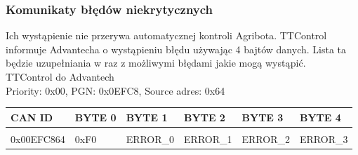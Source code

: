 \documentclass{article}
\begin{document}
\subsubsection{Komunikaty błędów niekrytycznych}
Ich wystąpienie nie przerywa automatycznej kontroli Agribota. TTControl informuje Advantecha o wystąpieniu błędu używając 4 bajtów danych. Lista ta będzie uzupełniania w raz z możliwymi błędami jakie mogą wystąpić.\\
TTControl do Advantech\\
Priority: 0x00, PGN: 0x0EFC8, Source adres: 0x64\\
\begin{left}
\begin{tabular}{ |p{2cm}|p{1.5cm}|p{1.5cm}|p{1.5cm}|p{1.5cm}|p{1.5cm}|}  
 \hline
 CAN ID & BYTE 0 & BYTE 1  & BYTE 2 & BYTE 3 & BYTE 4\\ \hline
 & & & & &\\
 0x00EFC864 & 0xF0 & ERROR\_0 & ERROR\_1 & ERROR\_2 & ERROR\_3\\ 
 \hline
\end{tabular}
\end{left}\\
\end{document}
